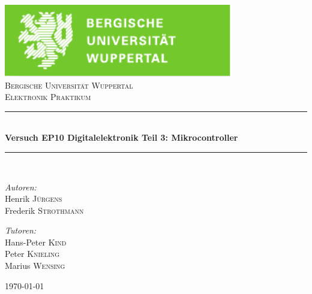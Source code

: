\documentclass[12pt,a4paper]{article}
\begin{document}


\begin{titlepage}

\begin{center}
\includegraphics[width=0.75\textwidth]{logo.pdf}\\[1cm]    	%

\textsc{\LARGE Bergische Universität Wuppertal}\\[1.5cm]	%

\textsc{\Large Elektronik Praktikum}\\[0.5cm]				%


\newcommand{\HRule}{\rule{\linewidth}{0.5mm}}
\HRule \\[0.4cm]
{ \huge \bfseries Versuch EP10 Digitalelektronik
Teil 3: Mikrocontroller}\\[0.4cm]				%

\HRule \\[1.5cm]

\begin{minipage}{0.4\textwidth}
\begin{flushleft} \large
\emph{Autoren:}\\
Henrik \textsc{Jürgens} \\
Frederik \textsc{Strothmann}
\end{flushleft}
\end{minipage}
\hfill
\begin{minipage}{0.4\textwidth}
\begin{flushright} \large
\emph{Tutoren:} \\
Hans-Peter \textsc{Kind} \\
Peter \textsc{Knieling} \\
Marius \textsc{Wensing}
\end{flushright}
\end{minipage}

\vfill

{\large \today}

\end{center}

\end{titlepage}
\end{document}
